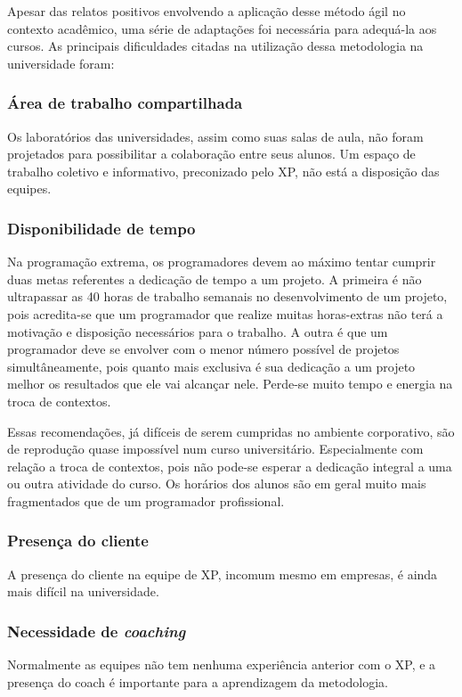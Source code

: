     Apesar das relatos positivos envolvendo a aplicação desse método ágil no contexto acadêmico, uma série de adaptações foi necessária para adequá-la aos cursos. As principais dificuldades citadas na utilização dessa metodologia na universidade foram:

    \subsubsection{Área de trabalho compartilhada}
      Os laboratórios das universidades, assim como suas salas de aula, não foram projetados para possibilitar a colaboração entre seus alunos. Um espaço de trabalho coletivo e informativo, preconizado pelo XP, não está a disposição das equipes.

    \subsubsection{Disponibilidade de tempo}
      Na programação extrema, os programadores devem ao máximo tentar cumprir duas metas referentes a dedicação de tempo a um projeto. A primeira é não ultrapassar as 40 horas de trabalho semanais no desenvolvimento de um projeto, pois acredita-se que um programador que realize muitas horas-extras não terá a motivação e disposição necessários para o trabalho. A outra é que um programador deve se envolver com o menor número possível de projetos simultâneamente, pois quanto mais exclusiva é sua dedicação a um projeto melhor os resultados que ele vai alcançar nele. Perde-se muito tempo e energia na troca de contextos. 

      Essas recomendações, já difíceis de serem cumpridas no ambiente corporativo, são de reprodução quase impossível num curso universitário. Especialmente com relação a troca de contextos, pois não pode-se esperar a dedicação integral a uma ou outra atividade do curso. Os horários dos alunos são em geral muito mais fragmentados que de um programador profissional.

    \subsubsection{Presença do cliente}
      A presença do cliente na equipe de XP, incomum mesmo em empresas, é ainda mais difícil na universidade.

    \subsubsection{Necessidade de \textit{coaching}}
      Normalmente as equipes não tem nenhuma experiência anterior com o XP, e a presença do coach é importante para a aprendizagem da metodologia.

